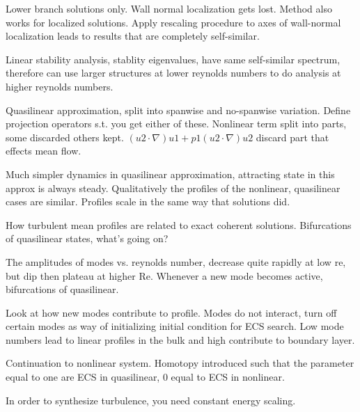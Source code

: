 \begin{description}
{\begin{description}
Lower branch solutions only. Wall normal localization gets lost.
Method also works for localized solutions.
Apply rescaling procedure to axes of wall-normal localization leads to results that are
completely self-similar.

Linear stability analysis, stablity eigenvalues, have same
self-similar spectrum, therefore
can use larger structures at lower reynolds numbers to do
analysis at higher reynolds numbers.

Quasilinear approximation, split into spanwise and no-spanwise variation.
Define projection operators s.t. you get either of these.
Nonlinear term split into parts, some discarded
others kept. $(u2 \cdot \nabla )u1 + p1 (u2 \cdot \nabla) u2$
discard part that effects mean flow.

Much simpler dynamics in quasilinear approximation, attracting state in this approx is
always steady.
Qualitatively the profiles of the nonlinear, quasilinear cases are similar.
Profiles scale in the same way that solutions did.

How turbulent mean profiles are related to exact coherent solutions.
Bifurcations of quasilinear states, what's going on?

The amplitudes of modes vs. reynolds number, decrease quite rapidly at low re, but
dip then plateau at higher Re.
Whenever a new mode becomes active, bifurcations of quasilinear.

Look at how new modes contribute to profile. Modes do not interact, turn off
certain modes as way of initializing initial condition for ECS search.
Low mode numbers lead to linear profiles in the bulk and high contribute to
boundary layer.

Continuation to nonlinear system. Homotopy introduced such that the parameter
equal to one are ECS in quasilinear, 0 equal to ECS in nonlinear.

In order to synthesize turbulence, you need constant energy scaling.
\end{description}
}

\end{description}

